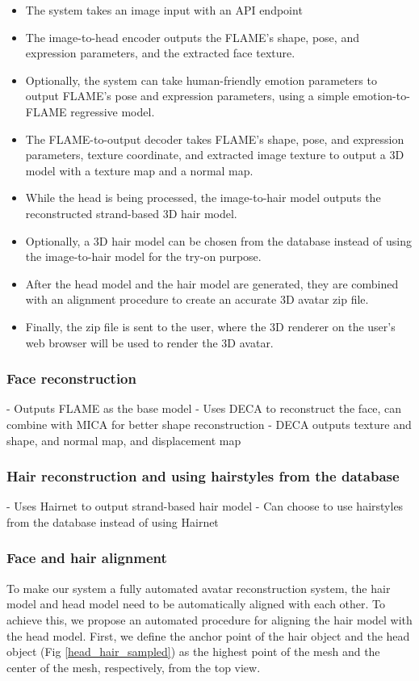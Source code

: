 \begin{itemize}
    \item The system takes an image input with an API endpoint
    \item The image-to-head encoder outputs the FLAME's shape, pose, and expression parameters, and the extracted face texture.
    \item Optionally, the system can take human-friendly emotion parameters to output FLAME's pose and expression parameters, using a simple emotion-to-FLAME regressive model.
    \item The FLAME-to-output decoder takes FLAME's shape, pose, and expression parameters, texture coordinate, and extracted image texture to output a 3D model with a texture map and a normal map.
    \item While the head is being processed, the image-to-hair model outputs the reconstructed strand-based 3D hair model.
    \item Optionally, a 3D hair model can be chosen from the database instead of using the image-to-hair model for the try-on purpose.
    \item After the head model and the hair model are generated, they are combined with an alignment procedure to create an accurate 3D avatar zip file.
    \item Finally, the zip file is sent to the user, where the 3D renderer on the user's web browser will be used to render the 3D avatar.
\end{itemize}

\subsubsection{Face reconstruction}
- Outputs FLAME as the base model
- Uses DECA to reconstruct the face, can combine with MICA for better shape reconstruction
- DECA outputs texture and shape, and normal map, and displacement map


\subsubsection{Hair reconstruction and using hairstyles from the database}
- Uses Hairnet to output strand-based hair model
- Can choose to use hairstyles from the database instead of using Hairnet

\subsubsection{Face and hair alignment}
To make our system a fully automated avatar reconstruction system, the hair model and head model need to be automatically aligned with each other. To achieve this, we propose an automated procedure for aligning the hair model with the head model.
First, we define the anchor point of the hair object and the head object (Fig \ref{head_hair_sampled}) as the highest point of the mesh and the center of the mesh, respectively, from the top view.


